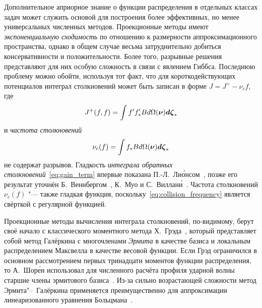 Дополнительное априорное знание о функции распределения в отдельных классах задач может служить
основой для построения более эффективных, но менее универсальных численных методов.
Проекционные методы имеют \emph{экспоненциальную сходимость} по отношению к размерности аппроксимационного пространства,
однако в общем случае весьма затруднительно добиться консервативности и положительности.
Более того, разрывные решения представляют для них особую сложность в связи с явлением Гиббса.
Последнюю проблему можно обойти, используя тот факт, что для короткодействующих потенциалов
интеграл столкновений может быть записан в форме \(J = J^+ - \nu_c f\), где
\begin{equation}\label{eq:gain_term}
    J^+(f,f) = \int f'f'_* Bd\Omega(\boldsymbol\nu)\boldsymbol{d\zeta}_*
\end{equation}
и \emph{частота столкновений}
\begin{equation}\label{eq:collision_frequency}
    \nu_c(f) = \int f_*Bd\Omega(\boldsymbol\nu)\boldsymbol{d\zeta}_*
\end{equation}
не содержат разрывов.
Гладкость \emph{интеграла обратных столкновений}~\eqref{eq:gain_term} впервые показана П.-Л.~Ли\'{о}нсом~\cite{Lions1994},
позже его результат уточнён Б.~Веннбергом~\cite{Wennberg1997}, К.~Муо и С.~Виллан\'{и}~\cite{Mouhot2004}.
Частота столкновений \(\nu_c(f)\) "--- также гладкая функция,
поскольку~\eqref{eq:collision_frequency} является свёрткой с регулярной функцией.

Проекционные методы вычисления интеграла столкновений, по-видимому, берут своё начало с классического
моментного метода Х.~Грэда~\cite{Grad1949}, который представляет собой метод Галёркина
с многочленами \emph{Эрмита} в качестве базиса и локальным распределением Максвелла в качестве весовой функции.
Если Грэд ограничился в основном рассмотрением первых тринадцати моментов функции распределения,
то А.~Шор\'{е}н использовал для численного расчёта профиля ударной волны старшие члены эрмитового базиса~\cite{Chorin1972}.
Из-за сильно возрастающей сложности метод Эрмита"--~Галёркина применяется преимущественно для
аппроксимации линеаризованного уравнения Больцмана~\cite{Gobbert2007}.

